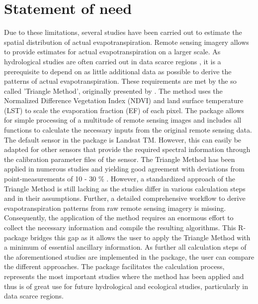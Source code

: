\documentclass[12pt]{article}
\begin{document}
\section*{Statement of need}

Due to these limitations, several studies have been carried out to estimate the spatial distribution of actual evapotranspiration. Remote sensing imagery allows to provide estimates for actual evapotranspiration on a larger scale. As hydrological studies are often carried out in data scarce regions \citep{Gampeetal2016, Meyeretal2016}, it is a prerequisite to depend on as little additional data as possible to derive the patterns of actual evapotranspiration. These requirements are met by the so called 'Triangle Method', originally presented by \citet{Jiangetal1999}. The method uses the Normalized Difference Vegetation Index (NDVI) and land surface temperature (LST) to scale the evaporation fraction (EF) of each pixel. The package allows for simple processing of a multitude of remote sensing images and includes all functions to calculate the necessary inputs from the original remote sensing data. The default sensor in the package is Landsat TM. However, this can easily be adapted for other sensors that provide the required spectral information through the calibration parameter files of the sensor. The Triangle Method has been applied in numerous studies \citep{Batraetal2006, Gampe2016, Stisenetal2008, Tangetal2010, Yangetal2011} and yielding good agreement with deviations from point-measurements of 10 - 30 \% \citep{Kalmaetal2008}. However, a standardized approach of the Triangle Method is still lacking as the studies differ in various calculation steps and in their assumptions. Further, a detailed comprehensive workflow to derive evapotranspiration patterns from raw remote sensing imagery is missing. Consequently, the application of the method requires an enormous effort to collect the necessary information and compile the resulting algorithms. This R-package bridges this gap as it allows the user to apply the Triangle Method with a minimum of essential ancillary information. As further all calculation steps of the aforementioned studies are implemented in the package, the user can compare the different approaches. The package facilitates the calculation process, represents the most important studies where the method has been applied and thus is of great use for future hydrological and ecological studies, particularly in data scarce regions. 



\end{document}
